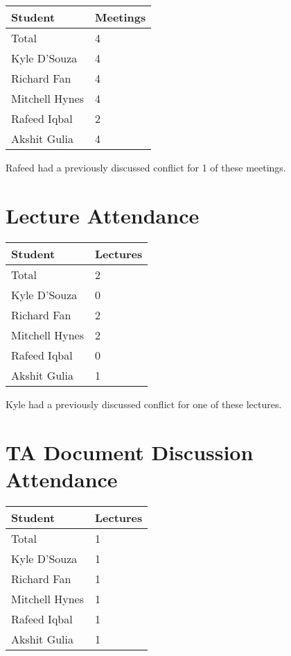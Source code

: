 \documentclass{article}
\begin{document}
\begin{table}[H]
  \centering
  \begin{tabular}{ll}
    \toprule
    \textbf{Student} & \textbf{Meetings}\\
    \midrule
    Total & 4\\
    Kyle D'Souza & 4\\
    Richard Fan & 4\\
    Mitchell Hynes & 4\\
    Rafeed Iqbal & 2\\
    Akshit Gulia & 4\\
    \bottomrule
  \end{tabular}
\end{table}

Rafeed had a previously discussed conflict for 1 of these meetings.

\section{Lecture Attendance}

\begin{table}[H]
  \centering
  \begin{tabular}{ll}
    \toprule
    \textbf{Student} & \textbf{Lectures}\\
    \midrule
    Total & 2\\
    Kyle D'Souza & 0\\
    Richard Fan & 2\\
    Mitchell Hynes & 2\\
    Rafeed Iqbal & 0\\
    Akshit Gulia & 1\\
    \bottomrule
  \end{tabular}
\end{table}

Kyle had a previously discussed conflict for one of these lectures.

\section{TA Document Discussion Attendance}

\begin{table}[H]
  \centering
  \begin{tabular}{ll}
    \toprule
    \textbf{Student} & \textbf{Lectures}\\
    \midrule
    Total & 1\\
    Kyle D'Souza & 1\\
    Richard Fan & 1\\
    Mitchell Hynes & 1\\
    Rafeed Iqbal & 1\\
    Akshit Gulia & 1\\
    \bottomrule
  \end{tabular}
\end{table}
\end{document}
